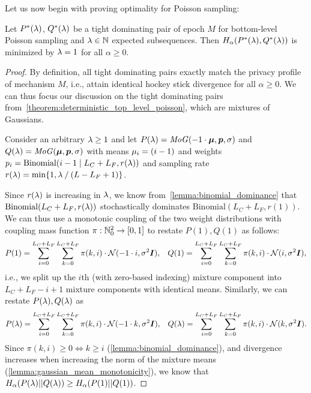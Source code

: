 Let us now begin with proving optimality for Poisson sampling:
\begin{lemma}\label{lemma:deterministic_top_level_monotonicity_poisson}
    Let $P^{*}(\lambda)$, $Q^{*}(\lambda)$ be a tight dominating pair of epoch $M$ for bottom-level Poisson sampling and $\lambda \in {\mathbb{N}}$ expected subsequences.
    Then $H_\alpha(P^{*}(\lambda), Q^{*}(\lambda))$ is minimized by $\lambda = 1$ for all $\alpha \geq 0$.
\end{lemma}
\begin{proof}
    By definition, all tight dominating pairs exactly match the privacy profile of mechanism $M$, i.e., attain identical hockey stick divergence for all $\alpha \geq 0$.
    We can thus focus our discussion on the tight dominating pairs from~\cref{theorem:deterministic_top_level_poisson}, which are mixtures of Gaussians.

    Consider an arbitrary $\lambda \geq 1$ and 
    let $P(\lambda) = \mathit{MoG}(-1 \cdot {\bm{\mu}}, {\bm{p}}, \sigma)$ and 
    $Q(\lambda) = \mathit{MoG}({\bm{\mu}}, {\bm{p}}, \sigma)$ with
    means ${\mu}_i = (i - 1)$ and 
    weights ${p}_i = \mathrm{Binomial}(i - 1 \mid L_C + L_F, r(\lambda))$
    and sampling rate $r(\lambda) = \min \{ 1, \lambda \mathbin{/} (L - L_F + 1)\}$.

    Since $r(\lambda)$ is increasing in $\lambda$, we know from~\cref{lemma:binomial_dominance} that
    $\mathrm{Binomial}(L_C + L_F, r(\lambda))$ stochastically dominates
    $\mathrm{Binomial}(L_C + L_F, r(1))$.
    We can thus use a monotonic coupling of the two weight distributions with coupling mass function $\pi : {\mathbb{N}}_0^2 \rightarrow [0,1]$ to restate $P(1),Q(1)$ as follows:
    \begin{align*}
        & P(1) =  \sum_{i=0}^{L_C + L_F} \sum_{k=0}^{L_C + L_F} \pi(k,i) \cdot \mathcal{N}(-1 \cdot i, \sigma^2 {\bm{I}}),
        & Q(1) =  \sum_{i=0}^{L_C + L_F} \sum_{k=0}^{L_C + L_F} \pi(k,i) \cdot \mathcal{N}(i, \sigma^2 {\bm{I}}),
    \end{align*}
    i.e., we split up the $i$th (with zero-based indexing) mixture component into $L_C + L_F - i + 1$ mixture components with identical means.
    Similarly, we can restate $P(\lambda),Q(\lambda)$ as 
    \begin{align*}
        & P(\lambda) =  \sum_{i=0}^{L_C + L_F} \sum_{k=0}^{L_C + L_F} \pi(k,i) \cdot \mathcal{N}(-1 \cdot k, \sigma^2 {\bm{I}}),
        & Q(\lambda) =  \sum_{i=0}^{L_C + L_F} \sum_{k=0}^{L_C + L_F} \pi(k,i) \cdot \mathcal{N}(k, \sigma^2 {\bm{I}}).
    \end{align*}
    Since $\pi(k,i) \geq 0 \iff k \geq i$ (\cref{lemma:binomial_dominance}), and divergence increases when increasing the norm of the mixture means (\cref{lemma:gaussian_mean_monotonicity}),
    we know that $H_\alpha(P(\lambda) || Q(\lambda)) \geq H_\alpha(P(1) || Q(1))$.
\end{proof}
